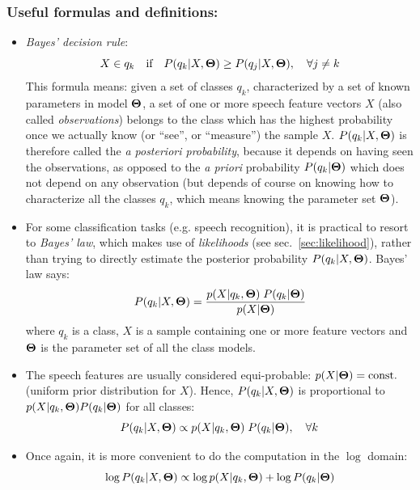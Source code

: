 \documentclass[a4paper]{article}
\newcommand{\Tm}{\ensuremath\boldsymbol{\Theta}}  %
\begin{document}
\subsubsection*{Useful formulas and definitions:}
\begin{itemize}
\item {\em Bayes' decision rule}:
  \[
  X \in q_k \quad \mbox{if} \quad P(q_k|X,\Tm) \geq P(q_j|X,\Tm),
  \quad\forall j \neq k
  \]
  This formula means: given a set of classes $q_k$, characterized by a
  set of known parameters in model $\Tm$, a set of one or more speech
  feature vectors $X$ (also called {\em observations}) belongs to the
  class which has the highest probability once we actually know (or
  ``see'', or ``measure'') the sample $X$. $P(q_k|X,\Tm)$ is therefore
  called the {\em a posteriori probability}, because it depends on
  having seen the observations, as opposed to the {\em a priori}
  probability $P(q_k|\Tm)$ which does not depend on any observation
  (but depends of course on knowing how to characterize all the
  classes $q_k$, which means knowing the parameter set $\Tm$).
  
\item For some classification tasks (e.g. speech recognition), it is
  practical to resort to {\em Bayes' law}, which makes use of {\em
    likelihoods} (see sec.~\ref{sec:likelihood}), rather than trying
  to directly estimate the posterior probability $P(q_k|X,\Tm)$.
  Bayes' law says:
  \begin{equation}
    \label{eq:decision-rule}
    P(q_k|X,\Tm) = \frac{p(X|q_k,\Tm)\; P(q_k|\Tm)}{p(X|\Tm)}
  \end{equation}
  where $q_k$ is a class, $X$ is a sample containing one or more
  feature vectors and $\Tm$ is the parameter set of all the class
  models.
  
\item The speech features are usually considered equi-probable:
  $p(X|\Tm)=\text{const.}$ (uniform prior distribution for $X$).
  Hence, $P(q_k|X,\Tm)$ is proportional to $p(X|q_k,\Tm) P(q_k|\Tm)$
  for all classes:
  \[
  P(q_k|X,\Tm) \propto p(X|q_k,\Tm)\; P(q_k|\Tm), \quad \forall k
  \]

\item Once again, it is more convenient to do the computation in the
  $\log$ domain:
  \begin{equation}
    \label{eq:log-decision-rule}
    \log P(q_k|X,\Tm) \propto \log p(X|q_k,\Tm) + \log P(q_k|\Tm)
  \end{equation}
\end{itemize}
\end{document}
